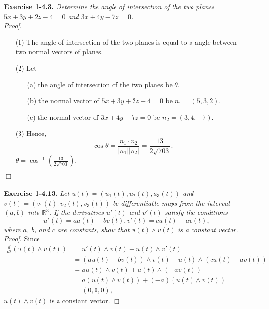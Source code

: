 \documentclass{article}
\begin{document}



\textbf{Exercise 1-4.3.}
\emph{Determine the angle of intersection of the two planes
$5x+3y+2z-4=0$ and $3x+4y-7z=0$.} \\

\emph{Proof.}
\begin{enumerate}
\item[(1)]
The angle of intersection of the two planes
is equal to a angle between two normal vectors of planes.
\item[(2)]
Let
  \begin{enumerate}
  \item[(a)]
  the angle of intersection of the two planes be $\theta$.
  \item[(b)]
  the normal vector of $5x+3y+2z-4=0$ be $n_1 = (5,3,2)$.
  \item[(c)]
  the normal vector of $3x+4y-7z=0$ be $n_2 = (3,4,-7)$.
  \end{enumerate}
\item[(3)]
Hence,
$$\cos\theta = \frac{n_1 \cdot n_2}{|n_1||n_2|} = \frac{13}{2\sqrt{703}}.$$
$\theta = \cos^{-1}\left( \frac{13}{2\sqrt{703}} \right)$.
\end{enumerate}
$\Box$ \\\\






\textbf{Exercise 1-4.13.}
\emph{Let $u(t) = (u_1(t), u_2(t), u_3(t))$ and $v(t) = (v_1(t), v_2(t), v_3(t))$
be differentiable maps from the interval $(a,b)$ into $\mathbb{R}^3$.
If the derivatives $u'(t)$ and $v'(t)$ satisfy the conditions
$$u'(t) = au(t) + bv(t), v'(t) = cu(t) - av(t),$$
where $a$, $b$, and $c$ are constants, show that
$u(t) \wedge v(t)$ is a constant vector.} \\

\emph{Proof.}
Since
\begin{align*}
  \frac{d}{dt}(u(t) \wedge v(t))
  &= u'(t) \wedge v(t) + u(t) \wedge v'(t) \\
  &= (au(t) + bv(t))\wedge v(t) + u(t) \wedge (cu(t) - av(t)) \\
  &= au(t) \wedge v(t) + u(t) \wedge (-av(t)) \\
  &= a(u(t) \wedge v(t)) + (-a)(u(t) \wedge v(t)) \\
  &= (0, 0, 0),
\end{align*}
$u(t) \wedge v(t)$ is a constant vector.
$\Box$ \\\\
\end{document}
